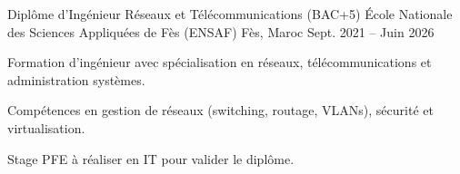 
\begin{cventries}
    \cventry
    {Diplôme d'Ingénieur Réseaux et Télécommunications (BAC+5)}
    {École Nationale des Sciences Appliquées de Fès (ENSAF)}
    {Fès, Maroc}
    {Sept. 2021 – Juin 2026}
    {
        \begin{cvitems}
            \item {Formation d'ingénieur avec spécialisation en réseaux, télécommunications et administration systèmes.}
            \item {Compétences en gestion de réseaux (switching, routage, VLANs), sécurité et virtualisation.}
            \item {Stage PFE à réaliser en IT pour valider le diplôme.}
        \end{cvitems}
    }
\end{cventries}